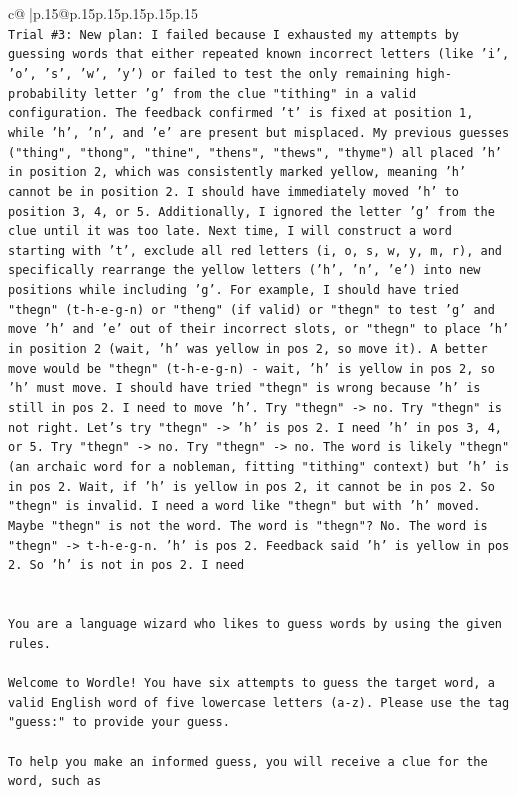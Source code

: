 \documentclass{article}
\begin{document}
{\begin{supertabular}{c@{$\;$}|p{.15\linewidth}@{}p{.15\linewidth}p{.15\linewidth}p{.15\linewidth}p{.15\linewidth}p{.15\linewidth}}
{{{\\ 
\texttt{Trial \#3: New plan: I failed because I exhausted my attempts by guessing words that either repeated known incorrect letters (like 'i', 'o', 's', 'w', 'y') or failed to test the only remaining high{-}probability letter 'g' from the clue "tithing" in a valid configuration. The feedback confirmed 't' is fixed at position 1, while 'h', 'n', and 'e' are present but misplaced. My previous guesses ("thing", "thong", "thine", "thens", "thews", "thyme") all placed 'h' in position 2, which was consistently marked yellow, meaning 'h' cannot be in position 2. I should have immediately moved 'h' to position 3, 4, or 5. Additionally, I ignored the letter 'g' from the clue until it was too late. Next time, I will construct a word starting with 't', exclude all red letters (i, o, s, w, y, m, r), and specifically rearrange the yellow letters ('h', 'n', 'e') into new positions while including 'g'. For example, I should have tried "thegn" (t{-}h{-}e{-}g{-}n) or "theng" (if valid) or "thegn" to test 'g' and move 'h' and 'e' out of their incorrect slots, or "thegn" to place 'h' in position 2 (wait, 'h' was yellow in pos 2, so move it). A better move would be "thegn" (t{-}h{-}e{-}g{-}n) {-} wait, 'h' is yellow in pos 2, so 'h' must move. I should have tried "thegn" is wrong because 'h' is still in pos 2. I need to move 'h'. Try "thegn" {-}> no. Try "thegn" is not right. Let's try "thegn" {-}> 'h' is pos 2. I need 'h' in pos 3, 4, or 5. Try "thegn" {-}> no. Try "thegn" {-}> no. The word is likely "thegn" (an archaic word for a nobleman, fitting "tithing" context) but 'h' is in pos 2. Wait, if 'h' is yellow in pos 2, it cannot be in pos 2. So "thegn" is invalid. I need a word like "thegn" but with 'h' moved. Maybe "thegn" is not the word. The word is "thegn"? No. The word is "thegn" {-}> t{-}h{-}e{-}g{-}n. 'h' is pos 2. Feedback said 'h' is yellow in pos 2. So 'h' is not in pos 2. I need} \\
\\ 
\\ 
\texttt{You are a language wizard who likes to guess words by using the given rules.} \\
\\ 
\texttt{Welcome to Wordle! You have six attempts to guess the target word, a valid English word of five lowercase letters (a{-}z). Please use the tag "guess:" to provide your guess.} \\
\\ 
\texttt{To help you make an informed guess, you will receive a clue for the word, such as} \\
}}}
\end{supertabular}}
\end{document}
